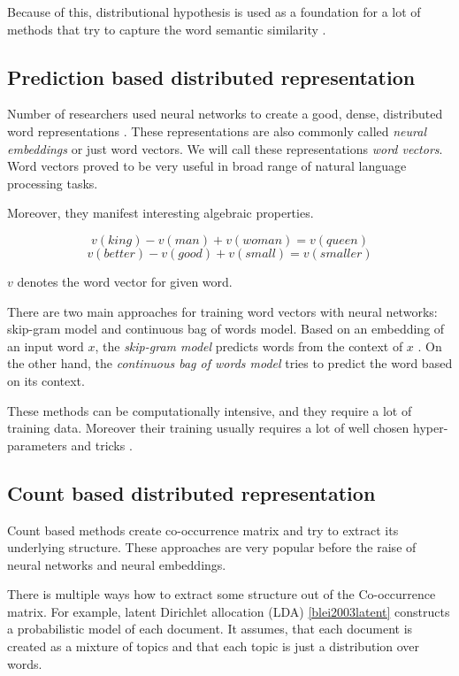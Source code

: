     Because of this, distributional hypothesis is used as a foundation for a lot of methods that try to capture the word semantic similarity \cite{rubenstein1965contextual}. 

    \subsection{Prediction based distributed representation}
    
    Number of researchers used neural networks to create a good, dense, distributed word representations \cite{pennington2014glove} \cite{DBLP:conf/icml/LeM14} \cite{rong2014word2vec}. %
    These representations are also commonly called \emph{neural embeddings} or just word vectors.
    We will call these representations \emph{word vectors}.
    Word vectors proved to be very useful in broad range of natural language processing tasks. 
    
    Moreover, they manifest interesting algebraic properties. 
    
    $$v(king) - v(man) + v(woman) = v(queen)$$
    $$v(better) - v(good) + v(small) = v(smaller)$$
    
    $v$ denotes the word vector for given word.
    
    There are two main approaches for training word vectors with neural networks: skip-gram model and continuous bag of words model.
    Based on an embedding of an input word $x$, the \textit{skip-gram model} predicts words from the context of $x$ .
    On the other hand, the \textit{continuous bag of words model} tries to predict the word based on its context.
    
    These methods can be computationally intensive, and they require a lot of training data. 
    Moreover their training usually requires a lot of well chosen hyper-parameters and tricks \cite{DBLP:journals/corr/MikolovSCCD13} \cite{vajdova2017}. %
    

    \subsection{Count based distributed representation}
    
    Count based methods create co-occurrence matrix and try to extract its underlying structure.
    These approaches are very popular before the raise of neural networks and neural embeddings.
    
    There is multiple ways how to extract some structure out of the Co-occurrence matrix.
    For example, latent Dirichlet allocation (LDA) \ref{blei2003latent} constructs a probabilistic model of each document. 
    It assumes, that each document is created as a mixture of topics and that each topic is just a distribution over words. 
    
